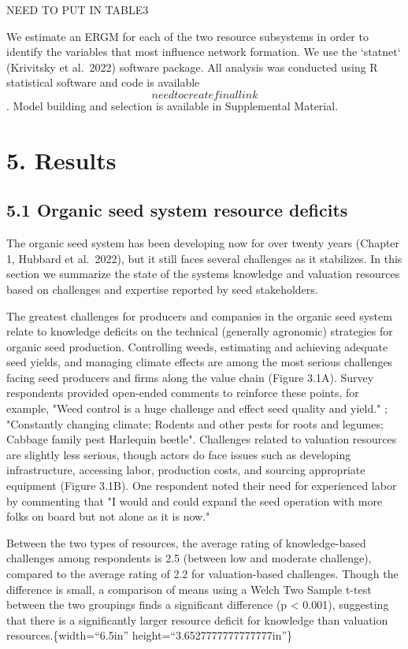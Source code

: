 \documentclass[twoside,12pt,final]{ucthesis-CA2012}
\begin{document}
\begin{ucmainmatter}
NEED TO PUT IN TABLE3

We estimate an ERGM for each of the two resource subsystems in order to
identify the variables that most influence network formation. We use the
`statnet` (Krivitsky et al.~2022) software package. All analysis was
conducted using R statistical software and code is available \[need to
create final link\]. Model building and selection is available in
Supplemental Material.

\hypertarget{results-2}{%
\section{5. Results}\label{results-2}}

\hypertarget{organic-seed-system-resource-deficits}{%
\subsection{5.1 Organic seed system resource deficits}\label{organic-seed-system-resource-deficits}}

The organic seed system has been developing now for over twenty years
(Chapter 1, Hubbard et al.~2022), but it still faces several challenges
as it stabilizes. In this section we summarize the state of the
system\textquotesingle s knowledge and valuation resources based on challenges and
expertise reported by seed stakeholders.

The greatest challenges for producers and companies in the organic seed
system relate to knowledge deficits on the technical (generally
agronomic) strategies for organic seed production. Controlling weeds,
estimating and achieving adequate seed yields, and managing climate
effects are among the most serious challenges facing seed producers and
firms along the value chain (Figure 3.1A). Survey respondents provided
open-ended comments to reinforce these points, for example, "Weed
control is a huge challenge and effect seed quality and yield." ;
"Constantly changing climate; Rodents and other pests for roots and
legumes; Cabbage family pest Harlequin beetle". Challenges related to
valuation resources are slightly less serious, though actors do face
issues such as developing infrastructure, accessing labor, production
costs, and sourcing appropriate equipment (Figure 3.1B). One respondent
noted their need for experienced labor by commenting that "I would and
could expand the seed operation with more folks on board but not alone
as it is now."

Between the two types of resources, the average rating of
knowledge-based challenges among respondents is 2.5 (between low and
moderate challenge), compared to the average rating of 2.2 for
valuation-based challenges. Though the difference is small, a comparison
of means using a Welch Two Sample t-test between the two groupings finds
a significant difference (p \textless{} 0.001), suggesting that there is a
significantly larger resource deficit for knowledge than valuation
resources.\{width=``6.5in''
height=``3.6527777777777777in''\}
\begin{figure}


\end{figure}
\end{ucmainmatter}
\end{document}
